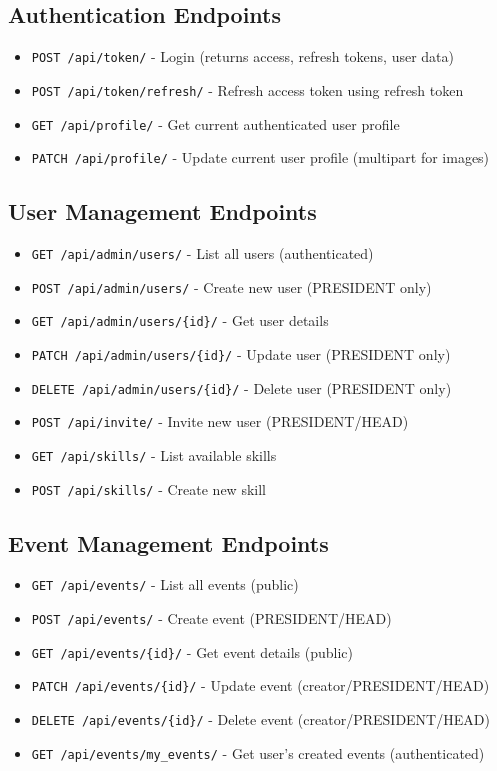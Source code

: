 \documentclass[11pt,a4paper]{article}
\begin{document}
\subsection{Authentication Endpoints}
\begin{itemize}[leftmargin=*]
    \item \texttt{POST /api/token/} - Login (returns access, refresh tokens, user data)
    \item \texttt{POST /api/token/refresh/} - Refresh access token using refresh token
    \item \texttt{GET /api/profile/} - Get current authenticated user profile
    \item \texttt{PATCH /api/profile/} - Update current user profile (multipart for images)
\end{itemize}

\subsection{User Management Endpoints}
\begin{itemize}[leftmargin=*]
    \item \texttt{GET /api/admin/users/} - List all users (authenticated)
    \item \texttt{POST /api/admin/users/} - Create new user (PRESIDENT only)
    \item \texttt{GET /api/admin/users/\{id\}/} - Get user details
    \item \texttt{PATCH /api/admin/users/\{id\}/} - Update user (PRESIDENT only)
    \item \texttt{DELETE /api/admin/users/\{id\}/} - Delete user (PRESIDENT only)
    \item \texttt{POST /api/invite/} - Invite new user (PRESIDENT/HEAD)
    \item \texttt{GET /api/skills/} - List available skills
    \item \texttt{POST /api/skills/} - Create new skill
\end{itemize}

\subsection{Event Management Endpoints}
\begin{itemize}[leftmargin=*]
    \item \texttt{GET /api/events/} - List all events (public)
    \item \texttt{POST /api/events/} - Create event (PRESIDENT/HEAD)
    \item \texttt{GET /api/events/\{id\}/} - Get event details (public)
    \item \texttt{PATCH /api/events/\{id\}/} - Update event (creator/PRESIDENT/HEAD)
    \item \texttt{DELETE /api/events/\{id\}/} - Delete event (creator/PRESIDENT/HEAD)
    \item \texttt{GET /api/events/my\_events/} - Get user's created events (authenticated)
\end{itemize}
\end{document}
